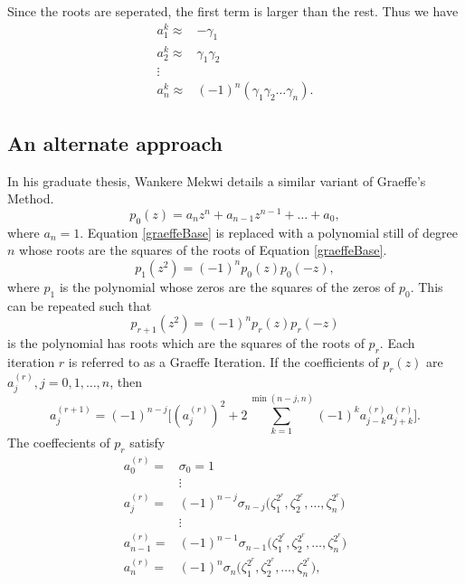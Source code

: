 \documentclass{article}
\begin{document}
Since the roots are seperated, the first term is larger than the rest.\cite{mathworld:graeffe}
Thus we have
\begin{align*}
	a_1^k \approx& -\gamma_1 \\
	a_2^k \approx& \gamma_1\gamma_2 \\
	\vdots & \\
	a_n^k \approx& (-1)^n(\gamma_1\gamma_2\dots\gamma_n).
\end{align*}

\subsection{An alternate approach}

In his graduate thesis\cite{iterative}, Wankere Mekwi details a similar variant of Graeffe's Method.
\begin{equation}\label{graeffeBase}
	p_0(z)=a_nz^n+a_{n-1}z^{n-1}+\dots+a_0,
\end{equation}
where $a_n=1$.
Equation \ref{graeffeBase} is replaced with a polynomial still of degree $n$ whose roots are the squares of the roots of Equation \ref{graeffeBase}.
\begin{equation}\label{graeffe:p1}
	p_1(z^2)=(-1)^np_0(z)p_0(-z),
\end{equation}
where $p_1$ is the polynomial whose zeros are the squares of the zeros of $p_0$.
This can be repeated such that
\begin{equation}
	p_{r+1}(z^2)=(-1)^np_r(z)p_r(-z)
\end{equation}
is the polynomial has roots which are the squares of the roots of $p_r$.
Each iteration $r$ is referred to as a Graeffe Iteration.\cite{graeffe-iteration}
If the coefficients of $p_r(z)$ are $a_j^{(r)},j=0,1,\dots,n$, then
\begin{equation}
	a_j^{(r+1)}=(-1)^{n-j}\bigg[(a_j^{(r)})^2+2\sum^{\min(n-j,n)}_{k=1}(-1)^ka_{j-k}^{(r)}a_{j+k}^{(r)}\bigg].
\end{equation}
The coeffecients of $p_r$ satisfy
\begin{equation}
	\begin{aligned}
		a_0^{(r)} =& \sigma_0 = 1 \\
		&\vdots \\
		a_j^{(r)} =& (-1)^{n-j}\sigma_{n-j}\big(\zeta_1^{2^r},\zeta_2^{2^r},\dots,\zeta_n^{2^r}\big) \\
		&\vdots \\
		a_{n-1}^{(r)} =& (-1)^{n-1}\sigma_{n-1}\big(\zeta_1^{2^r},\zeta_2^{2^r},\dots,\zeta_n^{2^r}\big) \\
		a_n^{(r)} =& (-1)^n\sigma_n\big(\zeta_1^{2^r},\zeta_2^{2^r},\dots,\zeta_n^{2^r}\big),
	\end{aligned}
\end{equation}
\end{document}
